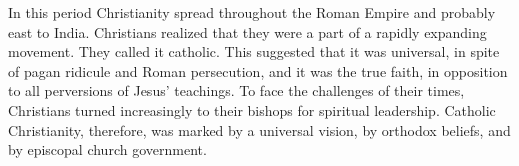 
\begin{partsummary}
In this period Christianity spread throughout the Roman Empire and probably east to India.
Christians realized that they were a part of a rapidly expanding movement. They called it catholic.
This suggested that it was universal, in spite of pagan ridicule and Roman persecution, and it was
the true faith, in opposition to all perversions of Jesus’ teachings. To face the challenges of
their times, Christians turned increasingly to their bishops for spiritual leadership. Catholic
Christianity, therefore, was marked by a universal vision, by orthodox beliefs, and by episcopal
church government.
\end{partsummary}

